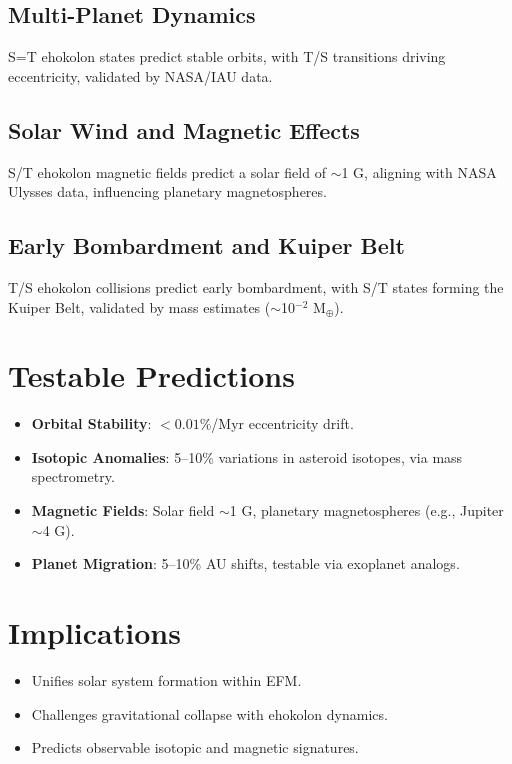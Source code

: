 \documentclass[11pt]{article}
\begin{document}
\subsection{Multi-Planet Dynamics}
S=T ehokolon states predict stable orbits, with T/S transitions driving eccentricity, validated by NASA/IAU data.

\subsection{Solar Wind and Magnetic Effects}
S/T ehokolon magnetic fields predict a solar field of \(\sim\)1 G, aligning with NASA Ulysses data, influencing planetary magnetospheres.

\subsection{Early Bombardment and Kuiper Belt}
T/S ehokolon collisions predict early bombardment, with S/T states forming the Kuiper Belt, validated by mass estimates (\(\sim\)10$^{-2}$ M$_\oplus$).

\section{Testable Predictions}
\begin{itemize}
    \item \textbf{Orbital Stability}: \(<0.01\%\)/Myr eccentricity drift.
    \item \textbf{Isotopic Anomalies}: 5--10\% variations in asteroid isotopes, via mass spectrometry.
    \item \textbf{Magnetic Fields}: Solar field \(\sim\)1 G, planetary magnetospheres (e.g., Jupiter \(\sim\)4 G).
    \item \textbf{Planet Migration}: 5--10\% AU shifts, testable via exoplanet analogs.
\end{itemize}

\section{Implications}
\begin{itemize}
    \item Unifies solar system formation within EFM.
    \item Challenges gravitational collapse with ehokolon dynamics.
    \item Predicts observable isotopic and magnetic signatures.
\end{itemize}
\end{document}

